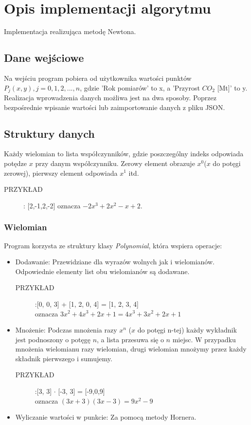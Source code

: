 \documentclass[12pt]{article}
\begin{document}
\section{Opis implementacji algorytmu}
Implementacja realizująca metodę Newtona.
\subsection{Dane wejściowe}
Na wejściu program pobiera od użytkownika wartości punktów \\$P_{j}(x,y), j=0,1,2,...,n$, gdzie 'Rok pomiarów' to x, a 'Przyrost $ CO_{2}$ [Mt]' to y. Realizacja wprowadzenia danych możliwa jest na dwa sposoby. Poprzez bezpośrednie wpisanie wartości lub zaimportowanie danych z pliku JSON.
\subsection{Struktury danych}
Każdy wielomian to lista współczynników, gdzie poszczególny indeks odpowiada potędze $x$ przy danym współczynniku. Zerowy element obrazuje $ x^{0} $($x$ do potęgi zerowej), pierwszy element odpowiada $ x^{1} $ itd. 
\begin{description}
 
 \item[PRZYKŁAD]:\hspace{5 mm}  [2,-1,2,-2] oznacza $-2x^{3} + 2x^{2} - x + 2$.
 \\
\end{description}
\subsubsection{Wielomian}Program korzysta ze struktury klasy \emph{Polynomial}, która wspiera operacje:
\begin{itemize}
 \item Dodawanie: Przewidziane dla wyrazów wolnych jak i wielomianów. Odpowiednie elementy list obu wielomianów są dodawane.
 \begin{description}
 
 \item[PRZYKŁAD]:\hspace{5 mm}[0, 0, 3] + [1, 2, 0, 4] = [1, 2, 3, 4] \\ oznacza 
  $3x^2 + 4x^{3}+2x+1 = 4x^{3}+3x^{2}+2x+1 $
   \end{description}
 \item Mnożenie: Podczas mnożenia razy $x^{n}$ ($x$ do potęgi n-tej) każdy wykładnik jest podnoszony o potęgę $n$, a lista przesuwa się o $n$ miejsc. W przypadku mnożenia wielomianu razy wielomian, drugi wielomian mnożymy przez każdy składnik pierwszego i sumujemy.
 \begin{description}
 
\item[PRZYKŁAD]:\hspace{5 mm}[3, 3] $\cdot$ [-3, 3] = [-9,0,9] \\ oznacza $(3x + 3)(3x - 3) = 9x^{2} - 9$
 \end{description}
 \item Wyliczanie wartości w punkcie: Za pomocą metody Hornera.
\end{itemize}
\end{document}
